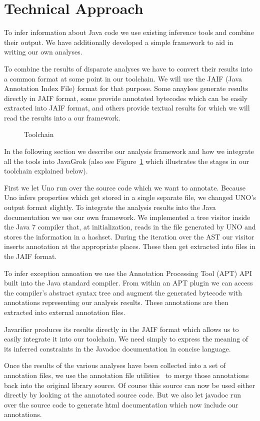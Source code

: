 \section{Technical Approach}
To infer information about Java code we use existing inference tools and
combine their output. We have additionally developed a simple framework to aid
in writing our own analyses.

To combine the results of disparate analyses we have to convert their results
into a common format at some point in our toolchain.  We will use the JAIF
(Java Annotation Index File) format for that purpose.  Some anaylses generate
results directly in JAIF format, some provide annotated bytecodes which can be
easily extracted into JAIF format, and others provide textual results for which
we will read the results into a our framework.

\begin{figure}
\centering
{}
\caption{Toolchain}
\label{fig:toolchain}
\end{figure}

In the following section we describe our analysis framework and how we
integrate all the tools into JavaGrok (also see Figure~\ref{fig:toolchain} 
which illustrates the stages in our toolchain explained below).

First we let Uno run over the source code which we want to annotate. 
Because Uno infers properties which get stored in a single separate file, 
we changed UNO's output format slightly. 
To integrate the analysis results into the Java documentation we
use our own framework. We implemented a tree visitor inside the Java 7 
compiler that, at initialization, reads in the file generated by UNO and 
stores the information in a hashset. During the iteration over the AST
our visitor inserts annotation at the appropriate places. These then
get extracted into files in the JAIF format.

To infer exception annoation we use the Annotation Processing Tool (APT)
API~\cite{apt} built into the Java standard compiler.  From within an APT plugin
we can access the compiler's abstract syntax tree and augment the generated
bytecode with annotations representing our analysis results. These annotations
are then extracted into external annotation files.

Javarifier produces its results directly in the JAIF format which allows us to
easily integrate it into our toolchain. We need simply to express the meaning
of its inferred constraints in the Javadoc documentation in concise language.

Once the results of the various analyses have been collected into a set of
annotation files, we use the annotation file utilities~\cite{AFU} to merge
those annotations back into the original library source. Of course this source
can now be used either directly by looking at the annotated source code. But
we also let javadoc run over the source code to generate html documentation
which now include our annotations.
